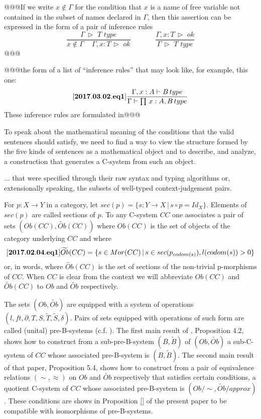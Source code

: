 \documentclass[12pt]{amsart}
\newenvironment{eq}{\begin{equation}}{\end{equation}}
\newcommand{\llabel}[1]{\label{#1}[{\bf #1}]}
\newcommand{\sr}{\rightarrow}
\newcommand{\wt}{\widetilde}
\newcommand{\spc}{{\,\,\,\,\,\,\,}}
\newcommand{\rh}{{\,\rhd\,\,}}
\newcommand{\type}{\,\,type}
\begin{document}
@@@If we write $x\notin \Gamma$ for the condition that $x$ is a name of free variable not contained in the subset of names declared in $\Gamma$, then this assertion can be expressed in the form of a pair of inference rules
%
$$
\frac{\Gamma\rh T\type}{x\notin\Gamma\spc\Gamma, x:T\rh ok}\spc\spc\spc
\frac{\Gamma, x:T\rh ok}{\Gamma\rh T\type}
$$
%
@@@

@@@the form of a list of ``inference rules'' that may look like, for example, this one:
%
\begin{eq}
\llabel{2017.03.02.eq1}
\frac{\Gamma,x:A\vdash B\,type}{\Gamma\vdash \prod\,x:A,B\,type}
\end{eq}
%
These inference rules are formulated in@@@

To speak about the mathematical meaning of the conditions that the valid sentences should satisfy, we need to find a way to view the structure formed by the five kinds of sentences as a mathematical object and to describe, and analyze, a construction that generates a C-system from such an object.

...  that were specified through their raw syntax and typing algorithms or, extensionally speaking, the subsets of well-typed context-judgement pairs. 


















For $p:X\sr Y$ in a category, let $sec(p)=\{s:Y\sr X\,|\,s\circ p=Id_X\}$. Elements of $sec(p)$ are called sections of $p$. To any C-system $CC$ one associates a pair of sets $(Ob(CC),\wt{Ob}(CC))$ where $Ob(CC)$ is the set of objects of the category underlying $CC$ and where 
%
\begin{eq}
\llabel{2017.02.04.eq1}
\wt{Ob}(CC)=\{s\in Mor(CC)\,|\,s\in sec(p_{codom(s)}), l(codom(s))>0\}
\end{eq}
%
or, in words, where $\wt{Ob}(CC)$ is the set of sections of the non-trivial p-morphisms of $CC$. When $CC$ is clear from the context we will abbreviate $Ob(CC)$ and $\wt{Ob}(CC)$ to $Ob$ and $\wt{Ob}$ respectively. 

The sets $(Ob,\wt{Ob})$ are equipped with a system of operations $(l,ft,\partial,T,S,\wt{T},\wt{S},\delta)$. Pairs of sets equipped with operations of such form are called (unital) pre-B-systems (c.f. \cite{Bsystemsnew}). The first main result of \cite{Csubsystems}, Proposition 4.2, shows how to construct from a sub-pre-B-system $(B,\wt{B})$ of $(Ob,\wt{Ob})$ a sub-C-system of $CC$ whose associated pre-B-system is $(B,\wt{B})$. The second main result of that paper, Proposition 5.4, shows how to construct from a pair of equivalence relations $(\sim,\approx)$ on $Ob$ and $\wt{Ob}$ respectively that satisfies certain conditions, a quotient C-system of $CC$ whose associated pre-B-system is $(Ob/\sim,\wt{Ob}/approx)$. These conditions are shows in Proposition \ref{} of the present paper to be compatible with isomorphisms of pre-B-systems. 
\end{document}
